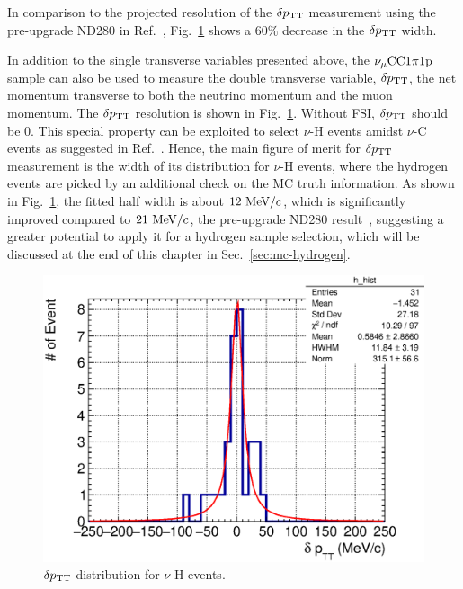      In comparison to the projected resolution of the $\delta p_\textrm{TT}$ measurement using the pre-upgrade ND280 in Ref.~\cite{lu:2015hea}, Fig.~\ref{fig:1pi-tki-dptt} shows a $60\%$ decrease in the $\delta p_\textrm{TT}$ width.

     In addition to the single transverse variables presented above, the $\nu_{\mu}\textrm{CC}1\pi1\textrm{p}$ sample can also be used to measure the double transverse variable, $\delta p_\textrm{TT}$, the net momentum transverse to both the neutrino momentum and the muon momentum.
     The $\delta p_\textrm{TT}$ resolution is shown in Fig.~\ref{fig:1pi-tki-dptt}.
     Without FSI, $\delta p_\textrm{TT}$ should be $0$. This special property can be exploited to select $\nu$-H events amidst $\nu$-C events as suggested in Ref.~\cite{lu:2015hea}. 
     Hence, the main figure of merit for $\delta p_\textrm{TT}$ measurement is the width of its distribution for $\nu$-H events, where the hydrogen events are picked by an additional check on the MC truth information.
     As shown in Fig.~\ref{fig:1pi-tki-dptt}, the fitted half width is about $12~\textrm{MeV}/c$, which is significantly improved compared to $21~\textrm{MeV}/c$, the pre-upgrade ND280 result~\cite{lu:2015hea}, suggesting a greater potential to apply it for a hydrogen sample selection, which will be discussed at the end of this chapter in Sec.~\ref{sec:mc-hydrogen}.

     \begin{figure}[!htb] 
          \centering 		
          \includegraphics[width=\sgfigwid\textwidth]{figures/perf/tki/SFGpTPCmu_dptt_hist_al15_H_bin100_range500_Lfit.eps}
          \caption{\label{fig:1pi-tki-dptt} $\delta p_\textrm{TT}$ distribution for $\nu$-H events.} 
     \end{figure}


